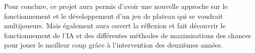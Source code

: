 \medbreak

Pour conclure, ce projet aura permis d'avoir une nouvelle approche sur le fonctionnement et le développement d'un jeu de plateau qui se voudrait multijoueurs. Mais également aura ouvert la réflexion et fait découvrir le fonctionnement de l'IA et des différentes méthodes de maximisations des chances pour jouer le meilleur coup grâce à l'intervention des deuxièmes années.




